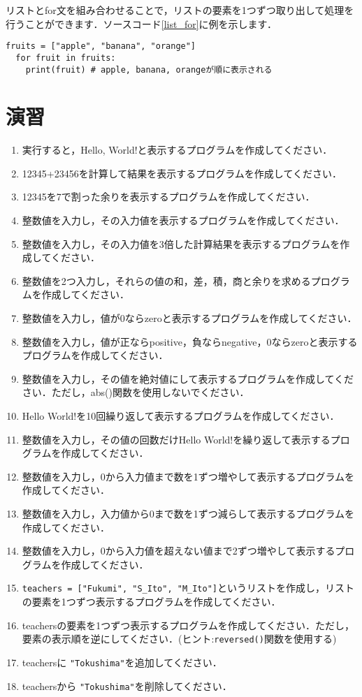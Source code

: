 \documentclass{jarticle}
\begin{document}
リストとfor文を組み合わせることで，リストの要素を1つずつ取り出して処理を行うことができます．ソースコード\ref{list_for}に例を示します．
\begin{lstlisting}[caption=リストとfor文,label=list_for]
  fruits = ["apple", "banana", "orange"]
  for fruit in fruits:
    print(fruit) # apple, banana, orangeが順に表示される
\end{lstlisting}

\section{演習}
\begin{enumerate}
  \item 実行すると，Hello, World!と表示するプログラムを作成してください．
  \item 12345+23456を計算して結果を表示するプログラムを作成してください．
  \item 12345を7で割った余りを表示するプログラムを作成してください．
  \item 整数値を入力し，その入力値を表示するプログラムを作成してください．
  \item 整数値を入力し，その入力値を3倍した計算結果を表示するプログラムを作成してください．
  \item 整数値を2つ入力し，それらの値の和，差，積，商と余りを求めるプログラムを作成してください．
  \item 整数値を入力し，値が0ならzeroと表示するプログラムを作成してください．
  \item 整数値を入力し，値が正ならpositive，負ならnegative，0ならzeroと表示するプログラムを作成してください．
  \item 整数値を入力し，その値を絶対値にして表示するプログラムを作成してください．ただし，abs()関数を使用しないでください．
  \item Hello World!を10回繰り返して表示するプログラムを作成してください．
  \item 整数値を入力し，その値の回数だけHello World!を繰り返して表示するプログラムを作成してください．
  \item 整数値を入力し，0から入力値まで数を1ずつ増やして表示するプログラムを作成してください．
  \item 整数値を入力し，入力値から0まで数を1ずつ減らして表示するプログラムを作成してください．
  \item 整数値を入力し，0から入力値を超えない値まで2ずつ増やして表示するプログラムを作成してください．
  \item \texttt{teachers = ["Fukumi", "S\_Ito", "M\_Ito"]}というリストを作成し，リストの要素を1つずつ表示するプログラムを作成してください．
  \item teachersの要素を1つずつ表示するプログラムを作成してください．ただし，要素の表示順を逆にしてください．(ヒント:\texttt{reversed()}関数を使用する)
  \item teachersに \texttt{"Tokushima"}を追加してください．
  \item teachersから \texttt{"Tokushima"}を削除してください．
\end{enumerate}
\end{document}

